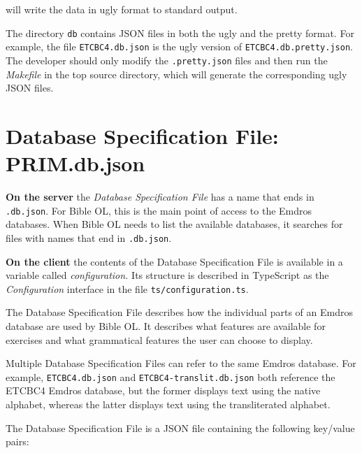 \documentclass[11pt,oneside,a4paper]{memoir}
\begin{document}
\noindent
will write the data in ugly format to standard output.

The directory \texttt{db} contains JSON files in both the ugly and the pretty format. For example,
the file \texttt{ETCBC4.db.json} is the ugly version of \texttt{ETCBC4.db.pretty.json}. The
developer should only modify the \texttt{.pretty.json} files and then run the
\emph{Makefile} in the top source directory, which will generate the corresponding ugly JSON files.




\section{Database Specification File: PRIM.db.json}\label{sec-dsf}

\textbf{On the server} the \emph{Database Specification File} has a name that ends in \texttt{.db.json}. For Bible OL,
this is the main point of access to the Emdros databases. When Bible OL needs to list the available
databases, it searches for files with names that end in \texttt{.db.json}.

\textbf{On the client} the contents of the Database Specification File is available in a variable
called \emph{configuration.}%
Its structure is described in TypeScript as the \emph{Configuration}%
interface in the file \texttt{ts/configuration.ts}.

The Database Specification File describes how the individual parts of an Emdros database are used by Bible
OL. It describes what features are available for exercises and what grammatical features the user
can choose to display.

Multiple Database Specification Files can refer to the same Emdros database. For example,
\texttt{ETCBC4.db.json} and \texttt{ETCBC4-translit.db.json} both reference the ETCBC4 Emdros
database, but the former displays text using the native alphabet, whereas the
latter displays text using the transliterated alphabet.

The Database Specification File is a JSON file containing the following key/value pairs:
\end{document}
